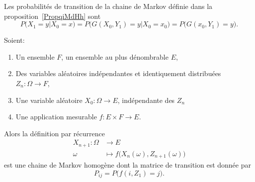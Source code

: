 Les probabilités de transition de la chaine de Markov définie dans la proposition~\ref{PropqiMdHh} sont
\begin{equation}
	P(X_1=y|X_0=x)=P\big( G(X_0,Y_1)=y|X_0=x_0 \big)=P\big( G(x_0,Y_1)=y \big).
\end{equation}

\begin{proposition}       \label{PROPooBYELooKLsthC}
    Soient:
    \begin{enumerate}
        \item
            Un ensemble \( F\), un ensemble au plus dénombrable \( E\),
        \item
            Des variables aléatoires indépendantes et identiquement distribuées \( Z_n\colon \Omega\to F\),
        \item
            Une variable aléatoire \( X_0\colon \Omega\to E\), indépendante des \( Z_n\)
        \item
            Une application mesurable \( f\colon E\times F \to E\).
    \end{enumerate}
    Alors la définition par récurrence 
    \begin{equation}
        \begin{aligned}
            X_{n+1}\colon \Omega&\to E \\
            \omega&\mapsto f\big( X_n(\omega),Z_{n+1}(\omega) \big) 
        \end{aligned}
    \end{equation}
    est une chaine de Markov homogène dont la matrice de transition est donnée par
    \begin{equation}
        P_{ij}=P\big( f(i,Z_1)=j \big).
    \end{equation}
\end{proposition}

